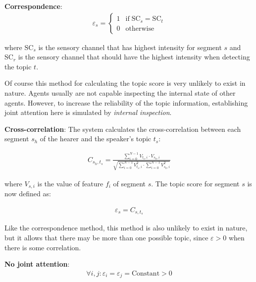 \begin{description}
\item {\bf Correspondence}:
\begin{eqnarray}\varepsilon_s = \left \{ \begin{array}{rl}
1 & \mbox{if}\;\mbox{SC}_s=\mbox{SC}_t\\
0 & \mbox{otherwise}
\end{array}
\right.
\end{eqnarray}

\noindent
where $\mbox{SC}_s$ is the sensory channel that has highest intensity for segment $s$ and $\mbox{SC}_r$ is the sensory channel that should have the highest intensity when detecting the topic $t$.

Of course this method for calculating the topic score is very unlikely to exist in nature. Agents usually are not capable inspecting the internal state of other agents. However, to increase the reliability of the topic information, establishing joint attention here is simulated by {\em internal inspection}.

\item {\bf Cross-correlation}: The system calculates the cross-correlation between each segment $s_h$ of the hearer and the speaker's topic $t_s$:

\begin{eqnarray}
\displaystyle
C_{s_h,t_s}=\frac{\sum_{i=0}^{N-1} V_{t_s,i} \cdot V_{s_h,i}}
{\sqrt{\sum_{i=0}^{N-1} V^2_{t_s,i} \cdot \sum_{i=0}^{N-1} V^2_{s_h,i}}}
\label{e:correlation}
\end{eqnarray}

\noindent
where $V_{s,i}$ is the value of feature $f_i$ of segment $s$. The topic score for segment $s$ is now defined as:

\begin{eqnarray}
\varepsilon_s=C_{s,t_s}
\end{eqnarray}

\noindent
Like the correspondence method, this method is also unlikely to exist in nature, but it allows that there may be more than one possible topic, since $\varepsilon>0$ when there is some correlation.

\item {\bf No joint attention}:
\begin{eqnarray}
\forall i,j: \varepsilon_i=\varepsilon_j=\mbox{Constant}>0
\end{eqnarray}
\end{description}

